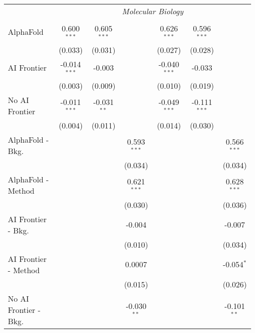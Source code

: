 \begin{tabular}{lcccccc}
 & \multicolumn{6}{c}{\textit{Molecular Biology}} \\ \\
   AlphaFold               & 0.600$^{***}$  & 0.605$^{***}$ &               & 0.626$^{***}$  & 0.596$^{***}$  &   \\   
                           & (0.033)        & (0.031)       &               & (0.027)        & (0.028)        &   \\   
   AI Frontier             & -0.014$^{***}$ & -0.003        &               & -0.040$^{***}$ & -0.033         &   \\   
                           & (0.003)        & (0.009)       &               & (0.010)        & (0.019)        &   \\   
   No AI Frontier          & -0.011$^{***}$ & -0.031$^{**}$ &               & -0.049$^{***}$ & -0.111$^{***}$ &   \\   
                           & (0.004)        & (0.011)       &               & (0.014)        & (0.030)        &   \\   
   AlphaFold - Bkg.        &                &               & 0.593$^{***}$ &                &                & 0.566$^{***}$\\   
                           &                &               & (0.034)       &                &                & (0.034)\\   
   AlphaFold - Method      &                &               & 0.621$^{***}$ &                &                & 0.628$^{***}$\\   
                           &                &               & (0.030)       &                &                & (0.036)\\   
   AI Frontier - Bkg.      &                &               & -0.004        &                &                & -0.007\\   
                           &                &               & (0.010)       &                &                & (0.034)\\   
   AI Frontier - Method    &                &               & 0.0007        &                &                & -0.054$^{*}$\\   
                           &                &               & (0.015)       &                &                & (0.026)\\   
   No AI Frontier - Bkg.   &                &               & -0.030$^{**}$ &                &                & -0.101$^{**}$\\   

\end{tabular}

